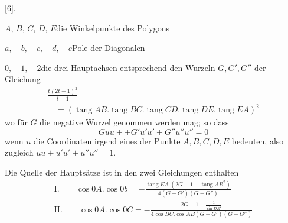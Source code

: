 \par\medskip{}\centerline{[6].}\nobreak\smallskip
\noindent\hspace*{2em}$A,\,B,\,C,\,D,\,E$\quad die Winkelpunkte des Polygons\par
\noindent\hspace*{2em}$a,\quad b,\quad c,\quad d,\quad e$\quad Pole der Diagonalen\par
\noindent\hspace*{2em}$0,\quad1,\quad2$\quad die drei Hauptachsen entsprechend den Wurzeln
$G,G',G''$ der Gleichung
\[
\begin{gathered}\frac{t(2t-1)^2}{t-1}\\[9pt]\quad{}=(\operatorname{tang}AB\mathord{.}\operatorname{tang}BC\mathord{.}\operatorname{tang}CD\mathord{.}\operatorname{tang}DE\mathord{.}\operatorname{tang}EA)^2\end{gathered}
\]
wo für $G$ die negative Wurzel genommen werden mag; so dass
\[
Guu++G'u'u'+G''u''u''=0
\]
wenn $u$ die Coordinaten irgend eines der Punkte $A,B,C,D,E$ bedeuten,
also zugleich $uu+u'u'+u''u''=1$.

Die Quelle der Hauptsätze ist in den zwei Gleichungen enthalten
\[
\begin{gathered} \text{I.}\qquad\cos0A\mathord{.}\cos0b=-\frac{\operatorname{tang}EA\mathord{.}(2G-1-\operatorname{tang}AB^2)}{4(G-G')(G-G'')}\\[9pt] \text{II.}\qquad\cos0A\mathord{.}\cos0C=-\frac{2G-1-\frac{1}{\sin DE^2}}{4\cos BC\mathord{.}\cos AB(G-G')(G-G'')} \end{gathered}
\]


